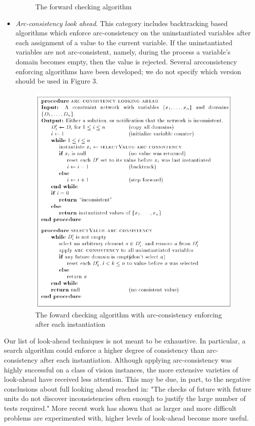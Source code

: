 \documentclass{article}
\begin{document}
\begin{itemize}
\begin{figure}[H]
    \caption{The forward checking algorithm}
  \end{figure}
  \item \textit{Arc-consistency look ahead}. This category includes backtracking based
  algorithms which enforce arc-consistency on the uninstantiated variables
  after each assignment of a value to the current variable. If the uninstantiated variables are not arc-consistent, namely, during the process a
  variable's domain becomes empty, then the value is rejected. Several arcconsistency enforcing algorithms have been developed; we do not specify
  which version should be used in Figure 3.
  \begin{figure}[H]
    \centering
    \includegraphics[scale=0.7]{Figs/arc-consistency-look-ahead.png}
    \caption{The foward checking algorithm with arc-consistency enforcing after each instantiation}
  \end{figure}
\end{itemize}
\bigskip
Our list of look-ahead techniques is not meant to be exhaustive. In particular, a search algorithm could enforce a higher degree of consistency than
arc-consistency after each instantiation. Although applying arc-consistency was
highly successful on a class of vision instances, the more extensive varieties of look-ahead have received less attention. This may be due, in part, to the negative conclusions about full looking ahead reached in: "The checks of
future with future units do not discover inconsistencies often enough to justify
the large number of tests required." More recent work has shown that as larger
and more difficult problems are experimented with, higher levels of look-ahead
become more useful.
\end{document}
